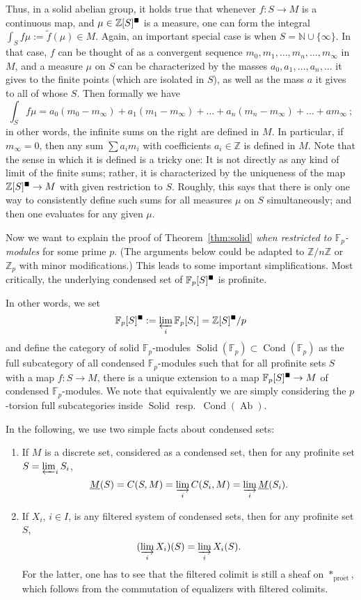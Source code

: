 \documentclass[11pt]{amsbook}
\DeclareMathOperator{\Cond}{Cond}
\DeclareMathOperator{\Ab}{Ab}
\newcommand{\proet}{{\mathrm{pro\acute{e}t}}}
\newcommand{\solid}{{\mathsmaller{\blacksquare}}}
\DeclareMathOperator{\Solid}{Solid}
\renewcommand*{\tilde}{\widetilde}
\numberwithin{equation}{section}
\numberwithin{theorem}{section}
\theoremstyle{definition}
\begin{document}
Thus, in a solid abelian group, it holds true that whenever $f: S\to M$ is a continuous map, and $\mu\in \mathbb Z[S]^\solid$ is a measure, one can form the integral $\int_S f \mu := \tilde{f}(\mu)\in M$. Again, an important special case is when $S=\mathbb N\cup\{\infty\}$. In that case, $f$ can be thought of as a convergent sequence $m_0,m_1,\ldots,m_n,\ldots,m_\infty$ in $M$, and a measure $\mu$ on $S$ can be characterized by the masses $a_0,a_1,\ldots,a_n,\ldots$ it gives to the finite points (which are isolated in $S$), as well as the mass $a$ it gives to all of whose $S$. Then formally we have
\[
\int_S f \mu = a_0(m_0-m_\infty) + a_1(m_1-m_\infty) + \ldots + a_n(m_n-m_\infty) +\ldots + a m_\infty\ ;
\]
in other words, the infinite sums on the right are defined in $M$. In particular, if $m_\infty=0$, then any sum $\sum a_im_i$ with coefficients $a_i\in \mathbb Z$ is defined in $M$. Note that the sense in which it is defined is a tricky one: It is not directly as any kind of limit of the finite sums; rather, it is characterized by the uniqueness of the map $\mathbb Z[S]^\solid\to M$ with given restriction to $S$. Roughly, this says that there is only one way to consistently define such sums for all measures $\mu$ on $S$ simultaneously; and then one evaluates for any given $\mu$.

Now we want to explain the proof of Theorem~\ref{thm:solid} \emph{when restricted to $\mathbb F_p$-modules} for some prime $p$. (The arguments below could be adapted to $\mathbb Z/n\mathbb Z$ or $\mathbb Z_p$ with minor modifications.) This leads to some important simplifications. Most critically, the underlying condensed set of $\mathbb F_p[S]^\solid$ is profinite.

In other words, we set
\[
\mathbb F_p[S]^\solid := \varprojlim_i \mathbb F_p[S_i] = \mathbb Z[S]^\solid/p
\]
and define the category of solid $\mathbb F_p$-modules $\Solid(\mathbb F_p)\subset \Cond(\mathbb F_p)$ as the full subcategory of all condensed $\mathbb F_p$-modules such that for all profinite sets $S$ with a map $f: S\to M$, there is a unique extension to a map $\mathbb F_p[S]^\solid\to M$ of condensed $\mathbb F_p$-modules. We note that equivalently we are simply considering the $p$-torsion full subcategories inside $\Solid$ resp.~$\Cond(\Ab)$.

In the following, we use two simple facts about condensed sets:
\begin{enumerate}
\item If $M$ is a discrete set, considered as a condensed set, then for any profinite set $S=\varprojlim_i S_i$,
\[
\underline{M}(S) = C(S,M) = \varinjlim_i C(S_i,M) = \varinjlim_i \underline{M}(S_i).
\]
\item If $X_i$, $i\in I$, is any filtered system of condensed sets, then for any profinite set $S$,
\[
(\varinjlim_i X_i)(S) = \varinjlim_i X_i(S).
\]
For the latter, one has to see that the filtered colimit is still a sheaf on $\ast_\proet$, which follows from the commutation of equalizers with filtered colimits.
\end{enumerate}
\end{document}

